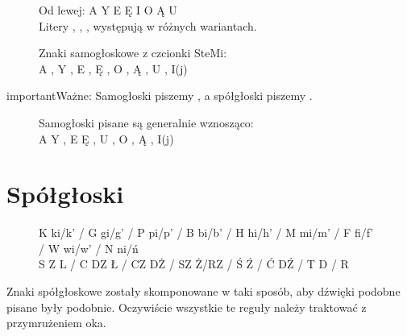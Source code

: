 \documentclass[letterpaper,10pt,polish]{sphinxmanual}
\begin{document}
\begin{figure}[htbp]
\centering
\capstart

\noindent{}
\caption{Od lewej: A Y E Ę I O Ą U \\
Litery , , ,  występują w różnych wariantach.}\label{\detokenize{alfabet-stemi:id1}}\end{figure}

\begin{figure}[htbp]
\centering
\capstart

\noindent{}
\caption{Znaki samogłoskowe z czcionki SteMi: \\
A , Y , E , Ę , O , Ą , U , I(j)}\label{\detokenize{alfabet-stemi:id2}}\end{figure}

\begin{sphinxadmonition}{important}{Ważne:}
\sphinxAtStartPar
Samogłoski piszemy  , a spółgłoski piszemy  .
\end{sphinxadmonition}

\begin{figure}[htbp]
\centering
\capstart

\noindent{}
\caption{Samogłoski pisane są generalnie wznosząco: \\
A Y ,  E Ę ,  U ,  O ,  Ą ,  I(j)}\label{\detokenize{alfabet-stemi:id3}}\end{figure}


\section{Spółgłoski}
\label{\detokenize{alfabet-stemi:spolgloski}}
\begin{figure}[htbp]
\centering
\capstart

\noindent{}
\caption{K ki/k’  / G gi/g’ / P pi/p’ / B bi/b’ / H hi/h’ / M  mi/m’ / F  fi/f’ / W wi/w’  / N ni/ń \\
S Z L / C DZ Ł / CZ DŻ / SZ Ż/RZ / Ś Ź / Ć DŹ / T D / R}\label{\detokenize{alfabet-stemi:id4}}\end{figure}

\sphinxAtStartPar
Znaki spółgłoskowe zostały skomponowane w taki sposób, aby dźwięki podobne pisane były podobnie. Oczywiście wszystkie te reguły należy traktować z przymrużeniem oka.
\end{document}
